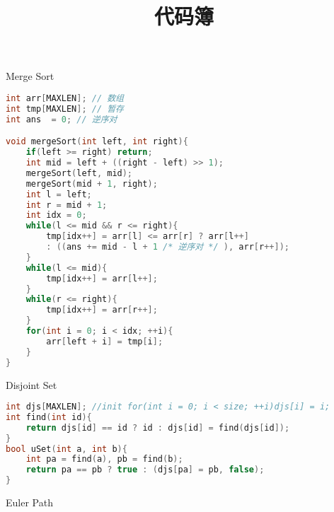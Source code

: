 \documentclass{article}
\title{代码簿}
\begin{document}
\maketitle

\begin{enumerate}



{\bf \LARGE \item  Merge Sort}
\begin{lstlisting}[language = C++]
int arr[MAXLEN]; // 数组
int tmp[MAXLEN]; // 暂存
int ans  = 0; // 逆序对

void mergeSort(int left, int right){
	if(left >= right) return;
	int mid = left + ((right - left) >> 1);
	mergeSort(left, mid);
	mergeSort(mid + 1, right);
	int l = left;
	int r = mid + 1;
	int idx = 0;	
	while(l <= mid && r <= right){		
		tmp[idx++] = arr[l] <= arr[r] ? arr[l++] 
		: ((ans += mid - l + 1 /* 逆序对 */ ), arr[r++]);
	}
	while(l <= mid){
		tmp[idx++] = arr[l++];
	}
	while(r <= right){
		tmp[idx++] = arr[r++];
	}
	for(int i = 0; i < idx; ++i){
		arr[left + i] = tmp[i];
	}
}
\end{lstlisting}

{\bf \LARGE \item  Disjoint Set}

\begin{lstlisting}[language = C++]
int djs[MAXLEN]; //init for(int i = 0; i < size; ++i)djs[i] = i;
int find(int id){
	return djs[id] == id ? id : djs[id] = find(djs[id]);
}
bool uSet(int a, int b){
	int pa = find(a), pb = find(b);
	return pa == pb ? true : (djs[pa] = pb, false);	
}
\end{lstlisting}

{\bf \LARGE \item  Euler Path}
\begin{lstlisting}[language = C++]

\end{lstlisting}


\end{enumerate}
\end{document}
